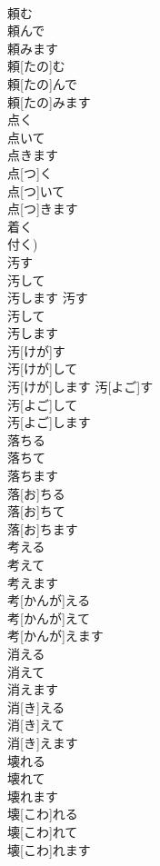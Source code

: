 \documentclass[8pt]{extreport}
\begin{document}
\begin{CJK}{UTF8}{min}
\\	頼む 
\\	頼んで 
\\	頼みます	
\\	頼[たの]む 
\\	頼[たの]んで 
\\	頼[たの]みます	
\\	点く 
\\	点いて 
\\	点きます	
\\	点[つ]く 
\\	点[つ]いて 
\\	点[つ]きます 
\\	着く 
\\	付く)	
\\	汚す 
\\	汚して 
\\	汚します 汚す 
\\	汚して 
\\	汚します	
\\	汚[けが]す 
\\	汚[けが]して 
\\	汚[けが]します 汚[よご]す 
\\	汚[よご]して 
\\	汚[よご]します	
\\	落ちる 
\\	落ちて 
\\	落ちます	
\\	落[お]ちる 
\\	落[お]ちて 
\\	落[お]ちます	
\\	考える 
\\	考えて 
\\	考えます	
\\	考[かんが]える 
\\	考[かんが]えて 
\\	考[かんが]えます	
\\	消える 
\\	消えて 
\\	消えます	
\\	消[き]える 
\\	消[き]えて 
\\	消[き]えます	
\\	壊れる 
\\	壊れて 
\\	壊れます	
\\	壊[こわ]れる 
\\	壊[こわ]れて 
\\	壊[こわ]れます	

\end{CJK}
\end{document}
